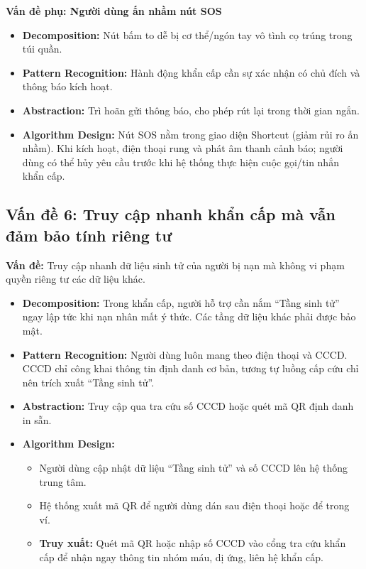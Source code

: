 \documentclass[a4paper,12pt]{article}
\begin{document}
\textbf{Vấn đề phụ: Người dùng ấn nhầm nút SOS}
\begin{itemize}
    \item \textbf{Decomposition:} Nút bấm to dễ bị cơ thể/ngón tay vô tình cọ trúng trong túi quần.
    \item \textbf{Pattern Recognition:} Hành động khẩn cấp cần sự xác nhận có chủ đích và thông báo kích hoạt.
    \item \textbf{Abstraction:} Trì hoãn gửi thông báo, cho phép rút lại trong thời gian ngắn.
    \item \textbf{Algorithm Design:} Nút SOS nằm trong giao diện Shortcut (giảm rủi ro ấn nhầm). Khi kích hoạt, điện thoại rung và phát âm thanh cảnh báo; người dùng có thể hủy yêu cầu trước khi hệ thống thực hiện cuộc gọi/tin nhắn khẩn cấp.
\end{itemize}

\subsection{Vấn đề 6: Truy cập nhanh khẩn cấp mà vẫn đảm bảo tính riêng tư}

\textbf{Vấn đề:} Truy cập nhanh dữ liệu sinh tử của người bị nạn mà không vi phạm quyền riêng tư các dữ liệu khác.

\begin{itemize}
    \item \textbf{Decomposition:} Trong khẩn cấp, người hỗ trợ cần nắm ``Tầng sinh tử'' ngay lập tức khi nạn nhân mất ý thức. Các tầng dữ liệu khác phải được bảo mật.
    \item \textbf{Pattern Recognition:} Người dùng luôn mang theo điện thoại và CCCD. CCCD chỉ công khai thông tin định danh cơ bản, tương tự luồng cấp cứu chỉ nên trích xuất ``Tầng sinh tử''.
    \item \textbf{Abstraction:} Truy cập qua tra cứu số CCCD hoặc quét mã QR định danh in sẵn.
    \item \textbf{Algorithm Design:}
    \begin{itemize}
        \item Người dùng cập nhật dữ liệu ``Tầng sinh tử'' và số CCCD lên hệ thống trung tâm.
        \item Hệ thống xuất mã QR để người dùng dán sau điện thoại hoặc để trong ví.
        \item \textbf{Truy xuất:} Quét mã QR hoặc nhập số CCCD vào cổng tra cứu khẩn cấp để nhận ngay thông tin nhóm máu, dị ứng, liên hệ khẩn cấp.
    \end{itemize}
\end{itemize}
\end{document}
